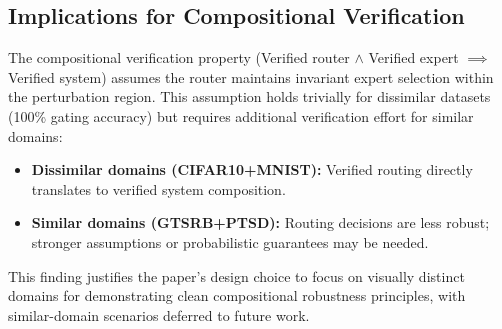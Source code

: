 \documentclass[11pt,a4paper]{article}
\begin{document}
\subsection{Implications for Compositional Verification}

The compositional verification property (Verified router $\land$ Verified expert $\implies$ Verified system) assumes the router maintains invariant expert selection within the perturbation region. This assumption holds trivially for dissimilar datasets (100\% gating accuracy) but requires additional verification effort for similar domains:

\begin{itemize}
    \item \textbf{Dissimilar domains (CIFAR10+MNIST):} Verified routing directly translates to verified system composition.
    \item \textbf{Similar domains (GTSRB+PTSD):} Routing decisions are less robust; stronger assumptions or probabilistic guarantees may be needed.
\end{itemize}

This finding justifies the paper's design choice to focus on visually distinct domains for demonstrating clean compositional robustness principles, with similar-domain scenarios deferred to future work.
\end{document}
